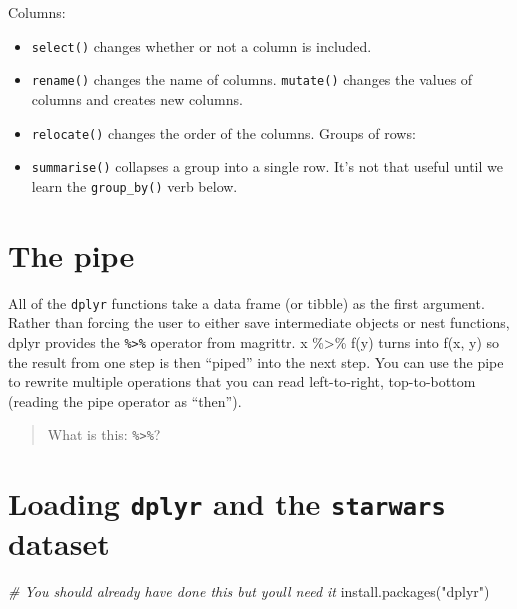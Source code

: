 \documentclass[
]{book}
\newenvironment{Shaded}{\begin{snugshade}}{\end{snugshade}}
\newcommand{\CommentTok}[1]{\textcolor[rgb]{0.56,0.35,0.01}{\textit{#1}}}
\newcommand{\FunctionTok}[1]{\textcolor[rgb]{0.00,0.00,0.00}{#1}}
\newcommand{\NormalTok}[1]{#1}
\newcommand{\StringTok}[1]{\textcolor[rgb]{0.31,0.60,0.02}{#1}}
\providecommand{\tightlist}{%
  \setlength{\itemsep}{0pt}\setlength{\parskip}{0pt}}
\begin{document}
Columns:

\begin{itemize}
\tightlist
\item
  \texttt{select()} changes whether or not a column is included.
\item
  \texttt{rename()} changes the name of columns.
  \texttt{mutate()} changes the values of columns and creates new columns.
\item
  \texttt{relocate()} changes the order of the columns.
  Groups of rows:
\item
  \texttt{summarise()} collapses a group into a single row. It's not that useful until we learn the \texttt{group\_by()} verb below.
\end{itemize}

\hypertarget{the-pipe}{%
\section{The pipe}\label{the-pipe}}

All of the \texttt{dplyr} functions take a data frame (or tibble) as the first argument. Rather than forcing the user to either save intermediate objects or nest functions, dplyr provides the \texttt{\%\textgreater{}\%} operator from magrittr. x \%\textgreater\% f(y) turns into f(x, y) so the result from one step is then ``piped'' into the next step. You can use the pipe to rewrite multiple operations that you can read left-to-right, top-to-bottom (reading the pipe operator as ``then'').

\begin{quote}
What is this: \texttt{\%\textgreater{}\%}?
\end{quote}

\hypertarget{loading-dplyr-and-the-starwars-dataset}{%
\section{\texorpdfstring{Loading \texttt{dplyr} and the \texttt{starwars} dataset}{Loading dplyr and the starwars dataset}}\label{loading-dplyr-and-the-starwars-dataset}}

\begin{Shaded}
\begin{Highlighting}[]
\CommentTok{\# You should already have done this but you\textquotesingle{}ll need it}
\FunctionTok{install.packages}\NormalTok{(}\StringTok{"dplyr"}\NormalTok{)}
\end{Highlighting}
\end{Shaded}
\end{document}
